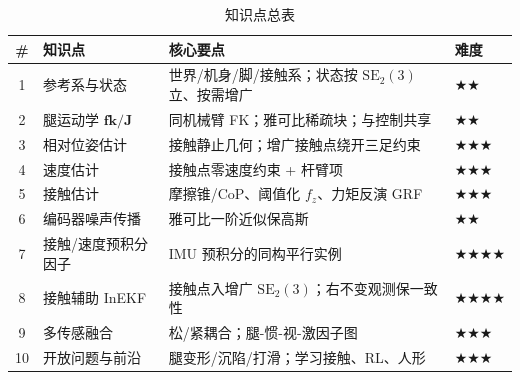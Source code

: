 \begin{table}[H]\centering\small
\caption{知识点总表}
\begin{tabular}{clll}
\toprule
\# & 知识点 & 核心要点 & 难度 \\
\midrule
1 & 参考系与状态 & 世界/机身/脚/接触系；状态按 $\mathrm{SE}_2(3)$ 立、按需增广 & $\bigstar\bigstar$ \\
2 & 腿运动学 $\mathbf{fk}/\mathbf{J}$ & 同机械臂 FK；雅可比稀疏块；与控制共享 & $\bigstar\bigstar$ \\
3 & 相对位姿估计 & 接触静止几何；增广接触点绕开三足约束 & $\bigstar\bigstar\bigstar$ \\
4 & 速度估计 & 接触点零速度约束 + 杆臂项 & $\bigstar\bigstar\bigstar$ \\
5 & 接触估计 & 摩擦锥/CoP、阈值化 $f_z$、力矩反演 GRF & $\bigstar\bigstar\bigstar$ \\
6 & 编码器噪声传播 & 雅可比一阶近似保高斯 & $\bigstar\bigstar$ \\
7 & 接触/速度预积分因子 & IMU 预积分的同构平行实例 & $\bigstar\bigstar\bigstar\bigstar$ \\
8 & 接触辅助 InEKF & 接触点入增广 $\mathrm{SE}_2(3)$；右不变观测保一致性 & $\bigstar\bigstar\bigstar\bigstar$ \\
9 & 多传感融合 & 松/紧耦合；腿-惯-视-激因子图 & $\bigstar\bigstar\bigstar$ \\
10 & 开放问题与前沿 & 腿变形/沉陷/打滑；学习接触、RL、人形 & $\bigstar\bigstar\bigstar$ \\
\bottomrule
\end{tabular}
\end{table}

